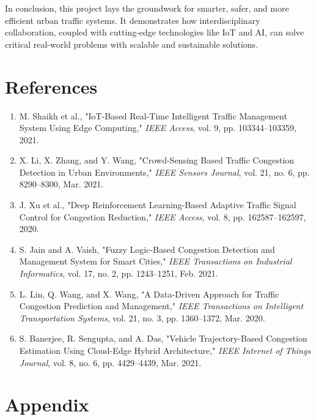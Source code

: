 \documentclass[12pt]{report}
\begin{document}
\vspace{0.5cm}

In conclusion, this project lays the groundwork for smarter, safer, and more efficient urban traffic systems. It demonstrates how interdisciplinary collaboration, coupled with cutting-edge technologies like IoT and AI, can solve critical real-world problems with scalable and sustainable solutions.




\chapter*{References}

\begin{enumerate}
    \item M. Shaikh et al., "IoT-Based Real-Time Intelligent Traffic Management System Using Edge Computing," \textit{IEEE Access}, vol. 9, pp. 103344--103359, 2021.
    
    \item X. Li, X. Zhang, and Y. Wang, "Crowd-Sensing Based Traffic Congestion Detection in Urban Environments," \textit{IEEE Sensors Journal}, vol. 21, no. 6, pp. 8290--8300, Mar. 2021.
    
    \item J. Xu et al., "Deep Reinforcement Learning-Based Adaptive Traffic Signal Control for Congestion Reduction," \textit{IEEE Access}, vol. 8, pp. 162587--162597, 2020.
    
    \item S. Jain and A. Vaish, "Fuzzy Logic-Based Congestion Detection and Management System for Smart Cities," \textit{IEEE Transactions on Industrial Informatics}, vol. 17, no. 2, pp. 1243--1251, Feb. 2021.
    
    \item L. Lin, Q. Wang, and X. Wang, "A Data-Driven Approach for Traffic Congestion Prediction and Management," \textit{IEEE Transactions on Intelligent Transportation Systems}, vol. 21, no. 3, pp. 1360--1372, Mar. 2020.
    
    \item S. Banerjee, R. Sengupta, and A. Das, "Vehicle Trajectory-Based Congestion Estimation Using Cloud-Edge Hybrid Architecture," \textit{IEEE Internet of Things Journal}, vol. 8, no. 6, pp. 4429--4439, Mar. 2021.
\end{enumerate}

\chapter*{Appendix}
\end{document}
